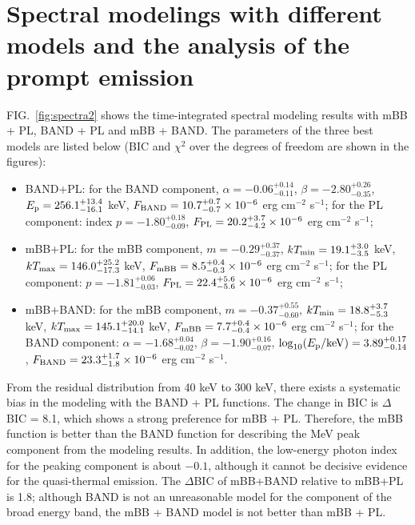 \documentclass[prd,twocolumn,amsmath,amssymb,aps,linenumbers]{revtex4-2} %
\begin{document}
\section{Spectral modelings with different models and the analysis of the prompt emission}\label{sec:spectra2}
FIG.~\ref{fig:spectra2} shows the time-integrated spectral modeling results with mBB + PL, BAND + PL and mBB + BAND.
The parameters of the three best models are listed below (BIC and $\chi^2$ over the degrees of freedom are shown in the figures):
\begin{itemize}
    \item BAND+PL: for the BAND component, $\alpha=-0.06^{+0.14}_{-0.11}$, $\beta=-2.80^{+0.26}_{-0.35}$, $E_{\rm p}=256.1^{+13.4}_{-16.1}$ keV, $F_{\rm BAND}=10.7^{+0.7}_{-0.7}\times10^{-6}$ erg cm$^{-2}$ s$^{-1}$; for the PL component: index $p=-1.80^{+0.18}_{-0.09}$, $F_{\rm PL}=20.2^{+3.7}_{-4.2}\times10^{-6}$ erg cm$^{-2}$ s$^{-1}$; 
    \item mBB+PL: for the mBB component, $m=-0.29^{+0.37}_{-0.37}$, $kT_{\rm min}=19.1^{+3.0}_{-3.5}$ keV, $kT_{\rm max}=146.0^{+25.2}_{-17.3}$ keV, $F_{\rm mBB}=8.5^{+0.4}_{-0.3}\times10^{-6}$ erg cm$^{-2}$ s$^{-1}$; for the PL component: $p=-1.81^{+0.06}_{-0.03}$, $F_{\rm PL}=22.4^{+5.6}_{-5.6}\times10^{-6}$ erg cm$^{-2}$ s$^{-1}$; 
    \item mBB+BAND: for the mBB component, $m=-0.37^{+0.55}_{-0.60}$, $kT_{\rm min}=18.8^{+3.7}_{-5.3}$ keV, $kT_{\rm max}=145.1^{+20.0}_{-14.1}$ keV, $F_{\rm mBB}=7.7^{+0.4}_{-0.4}\times10^{-6}$ erg cm$^{-2}$ s$^{-1}$; 
    for the BAND component: $\alpha=-1.68^{+0.04}_{-0.02}$, $\beta=-1.90^{+0.16}_{-0.07}$, $\log_{10}(E_{\rm p}/{\rm keV})=3.89^{+0.17}_{-0.14}$, $F_{\rm BAND}=23.3^{+1.7}_{-1.8}\times10^{-6}$ erg cm$^{-2}$ s$^{-1}$.
\end{itemize}
From the residual distribution from 40 keV to 300 keV, there exists a systematic bias in the modeling with the BAND + PL functions. The change in BIC is $\Delta$BIC = 8.1, which shows a strong preference for mBB + PL. Therefore, the mBB function is better than the BAND function for describing the MeV peak component from the modeling results. In addition, the low-energy photon index for the peaking component is about $-0.1$, although it cannot be decisive evidence for the quasi-thermal emission. The $\Delta$BIC of mBB+BAND relative to mBB+PL is 1.8; although BAND is not an unreasonable model for the component of the broad energy band, the mBB + BAND model is not better than mBB + PL.
\end{document}
